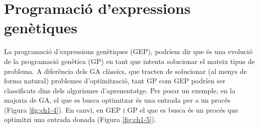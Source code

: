 



\section{Programació d'expressions genètiques} %
\label{sec:Programacio d'expressions genetiques}

La programació d'expressions genètiques (GEP), podríem dir que és una evolució de
la programació genètica (GP) en tant que intenta solucionar el mateix tipus de
problema.  A diferència dels GA clàssics, que tracten de solucionar (al menys de
forma natural) problemes d'optimització, tant GP com GEP podríen ser
classificats dins dels algorismes d'aprenentatge.  Per posar un exemple, en la
majoria de GA, el que es busca optimitzar és una entrada per a un procés
(Figura \ref{fig:ch1-4}).  En canvi, en GEP i GP el que es busca és un procés que
optimitzi una entrada donada (Figura \ref{fig:ch1-5}).

